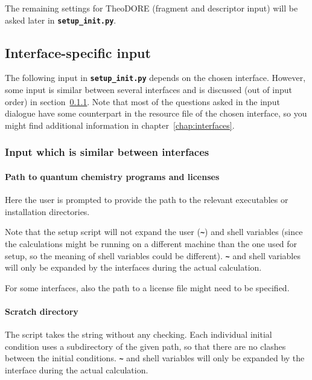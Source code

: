 \documentclass[a4paper,10pt,DIV=15,openany,twoside=false]{scrbook}
\newcommand{\ttt}[1]{\textbf{\texttt{#1}}}
\begin{document}
The remaining settings for TheoDORE (fragment and descriptor input) will be asked later in \ttt{setup\_init.py}.

\subsection{Interface-specific input}

The following input in \ttt{setup\_init.py} depends on the chosen interface.
However, some input is similar between several interfaces and is discussed (out of input order) in section~\ref{sec:setup_init.py:several}.
Note that most of the questions asked in the input dialogue have some counterpart in the resource file of the chosen interface, so you might find additional information in chapter~\ref{chap:interfaces}.


\subsubsection{Input which is similar between interfaces}\label{sec:setup_init.py:several}

\paragraph{Path to quantum chemistry programs and licenses}

Here the user is prompted to provide the path to the relevant executables or installation directories. 

Note that the setup script will not expand the user (\ttt{\textasciitilde}) and shell variables (since the calculations might be running on a different machine than the one used for setup, so the meaning of shell variables could be different). \ttt{\textasciitilde} and shell variables will only be expanded by the interfaces during the actual calculation.

For some interfaces, also the path to a license file might need to be specified.

\paragraph{Scratch directory}

The script takes the string without any checking. Each individual initial condition uses a subdirectory of the given path, so that there are no clashes between the initial conditions. \ttt{\textasciitilde} and shell variables will only be expanded by the interface during the actual calculation.
\end{document}
